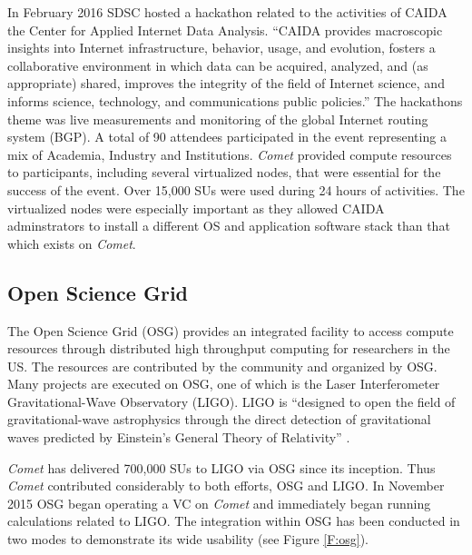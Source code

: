 In February 2016 SDSC hosted a hackathon \cite{caida} related to the activities of
CAIDA the Center for Applied Internet Data Analysis. ``CAIDA provides macroscopic insights into
Internet infrastructure, behavior, usage, and evolution, fosters a
collaborative environment in which data can be acquired, analyzed, and
(as appropriate) shared, improves the integrity of the field of
Internet science, and informs science, technology, and communications
public policies.''  The hackathons theme was live measurements and
monitoring of the global Internet routing system (BGP). A total of 90
attendees participated in the event representing a mix of Academia,
Industry and Institutions. {\em Comet\/} provided compute resources to
participants, including several virtualized nodes, that were essential
for the success of the event. Over 15,000 SUs were used during 24
hours of activities. The virtualized nodes were especially important
as they allowed CAIDA adminstrators to install a different OS and
application software stack than that which exists on {\em Comet\/}.

\subsection{Open Science Grid}

The Open Science Grid (OSG) \cite{osg} provides an integrated facility
to access compute resources through distributed high throughput
computing for researchers in the US. The resources are contributed by
the community and organized by OSG. Many projects are executed on OSG,
one of which is the Laser Interferometer Gravitational-Wave
Observatory (LIGO). LIGO is ``designed to open the field of
gravitational-wave astrophysics through the direct detection of
gravitational waves predicted by Einstein's General Theory of
Relativity'' \cite{ligo}.

{\em Comet\/} has delivered 700,000 SUs to LIGO via OSG since its
inception. Thus {\em Comet} contributed considerably to both
efforts, OSG and LIGO. In November 2015 OSG began operating a VC on
{\em Comet} and immediately began running calculations related to LIGO. The
integration within OSG has been conducted in two modes to demonstrate
its wide usability (see Figure \ref{F:osg}).

